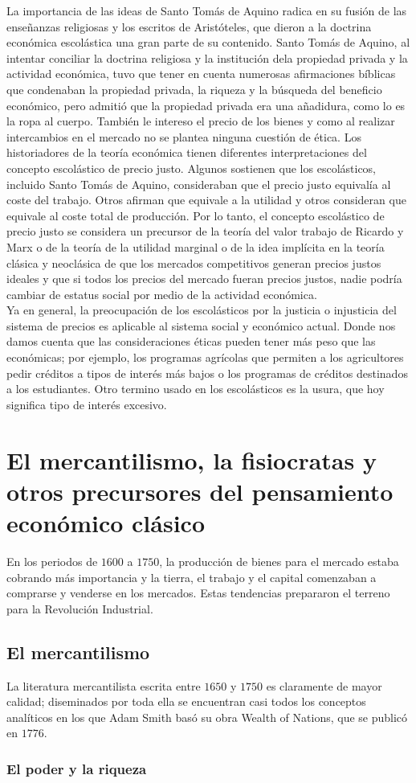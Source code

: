 \documentclass[10pt]{book}
\begin{document}
La importancia de las ideas de Santo Tomás de Aquino radica en su fusión de las enseñanzas religiosas y los escritos de Aristóteles, que dieron a la doctrina económica escolástica una gran parte de su contenido. Santo Tomás de Aquino, al intentar conciliar la doctrina religiosa y la institución dela propiedad privada y la actividad económica, tuvo que tener en cuenta numerosas afirmaciones bíblicas que condenaban la propiedad privada, la riqueza y la búsqueda del beneficio económico, pero admitió que la propiedad privada era una añadidura, como lo es la ropa al cuerpo. También le intereso el precio de los bienes y  como al realizar intercambios en el mercado no se plantea ninguna cuestión de ética. Los historiadores de la teoría económica tienen diferentes interpretaciones del concepto escolástico de precio justo. Algunos sostienen que los escolásticos, incluido Santo Tomás de Aquino, consideraban que el precio justo equivalía al coste del trabajo. Otros afirman que equivale a la utilidad y otros consideran que equivale al coste total de producción. Por lo tanto, el concepto escolástico de precio justo se considera un precursor de la teoría del valor trabajo de Ricardo y Marx o de la teoría de la utilidad marginal o de la idea implícita en la teoría clásica y neoclásica de que los mercados competitivos generan precios justos ideales y que si todos los precios del mercado fueran precios justos, nadie podría cambiar de estatus social por medio de la actividad económica.\\

Ya en general, la preocupación de los escolásticos por la justicia o injusticia del sistema de precios es aplicable al sistema social y económico actual. Donde nos damos cuenta que las consideraciones éticas pueden tener más peso que las económicas; por ejemplo, los programas agrícolas que permiten a los agricultores pedir créditos a tipos de interés más bajos o los programas de créditos destinados a los estudiantes. Otro termino usado en los escolásticos es la usura, que hoy significa tipo de interés excesivo.

\chapter{El mercantilismo, la fisiocratas y otros precursores del pensamiento económico clásico}
En los periodos de $1600$ a $1750$, la producción de bienes para el mercado estaba cobrando más importancia y la tierra, el trabajo y el capital comenzaban a comprarse y venderse en los mercados. Estas tendencias prepararon el terreno para la Revolución Industrial.

\section{El mercantilismo}
La literatura mercantilista escrita entre $1650$ y $1750$ es claramente de mayor calidad; diseminados por toda ella se encuentran casi todos los conceptos analíticos en los que Adam Smith basó su obra Wealth of Nations, que se publicó en $1776$.

\subsection{El poder y la riqueza}
\end{document}
